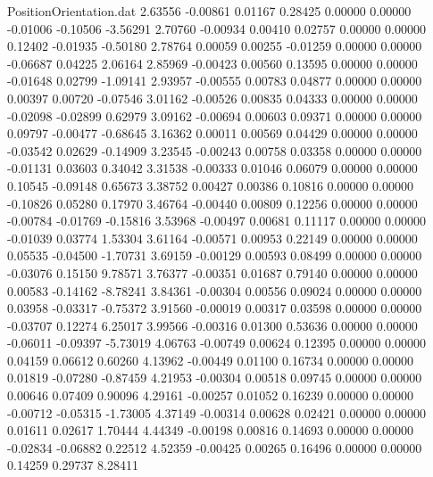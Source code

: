 \begin{filecontents}{PositionOrientation.dat}
   2.63556   -0.00861    0.01167     0.28425    0.00000    0.00000   -0.01006   -0.10506   -3.56291
   2.70760   -0.00934    0.00410     0.02757    0.00000    0.00000    0.12402   -0.01935   -0.50180
   2.78764    0.00059    0.00255    -0.01259    0.00000    0.00000   -0.06687    0.04225    2.06164
   2.85969   -0.00423    0.00560     0.13595    0.00000    0.00000   -0.01648    0.02799   -1.09141
   2.93957   -0.00555    0.00783     0.04877    0.00000    0.00000    0.00397    0.00720   -0.07546
   3.01162   -0.00526    0.00835     0.04333    0.00000    0.00000   -0.02098   -0.02899    0.62979
   3.09162   -0.00694    0.00603     0.09371    0.00000    0.00000    0.09797   -0.00477   -0.68645
   3.16362    0.00011    0.00569     0.04429    0.00000    0.00000   -0.03542    0.02629   -0.14909
   3.23545   -0.00243    0.00758     0.03358    0.00000    0.00000   -0.01131    0.03603    0.34042
   3.31538   -0.00333    0.01046     0.06079    0.00000    0.00000    0.10545   -0.09148    0.65673
   3.38752    0.00427    0.00386     0.10816    0.00000    0.00000   -0.10826    0.05280    0.17970
   3.46764   -0.00440    0.00809     0.12256    0.00000    0.00000   -0.00784   -0.01769   -0.15816
   3.53968   -0.00497    0.00681     0.11117    0.00000    0.00000   -0.01039    0.03774    1.53304
   3.61164   -0.00571    0.00953     0.22149    0.00000    0.00000    0.05535   -0.04500   -1.70731
   3.69159   -0.00129    0.00593     0.08499    0.00000    0.00000   -0.03076    0.15150    9.78571
   3.76377   -0.00351    0.01687     0.79140    0.00000    0.00000    0.00583   -0.14162   -8.78241
   3.84361   -0.00304    0.00556     0.09024    0.00000    0.00000    0.03958   -0.03317   -0.75372
   3.91560   -0.00019    0.00317     0.03598    0.00000    0.00000   -0.03707    0.12274    6.25017
   3.99566   -0.00316    0.01300     0.53636    0.00000    0.00000   -0.06011   -0.09397   -5.73019
   4.06763   -0.00749    0.00624     0.12395    0.00000    0.00000    0.04159    0.06612    0.60260
   4.13962   -0.00449    0.01100     0.16734    0.00000    0.00000    0.01819   -0.07280   -0.87459
   4.21953   -0.00304    0.00518     0.09745    0.00000    0.00000    0.00646    0.07409    0.90096
   4.29161   -0.00257    0.01052     0.16239    0.00000    0.00000   -0.00712   -0.05315   -1.73005
   4.37149   -0.00314    0.00628     0.02421    0.00000    0.00000    0.01611    0.02617    1.70444
   4.44349   -0.00198    0.00816     0.14693    0.00000    0.00000   -0.02834   -0.06882    0.22512
   4.52359   -0.00425    0.00265     0.16496    0.00000    0.00000    0.14259    0.29737    8.28411

\end{filecontents}
